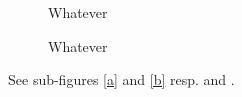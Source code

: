 \documentclass{article}
\begin{document}
\listoffigures

\begin{figure}
  \caption{Whatever}
\end{figure}

\begin{figure}
  \caption{Whatever}
\end{figure}

\bigskip

See sub-figures \ref{a} and \ref{b} resp.  and .
\end{document}
